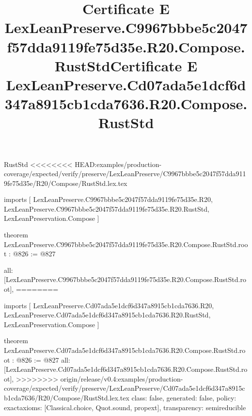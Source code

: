 \begin{lexlean}{RustStd}
<<<<<<<< HEAD:examples/production-coverage/expected/verify/preserve/LexLeanPreserve/C9967bbbe5c2047f57dda9119fe75d35e/R20/Compose/RustStd.lex.tex
\title{Certificate E LexLeanPreserve.C9967bbbe5c2047f57dda9119fe75d35e.R20.Compose.RustStd}
\begin{coremodule}
imports [
  LexLeanPreserve.C9967bbbe5c2047f57dda9119fe75d35e.R20,
  LexLeanPreserve.C9967bbbe5c2047f57dda9119fe75d35e.R20.RustStd,
  LexLeanPreservation.Compose
]

theorem LexLeanPreserve.C9967bbbe5c2047f57dda9119fe75d35e.R20.Compose.RustStd.root : @826 := @827 {
  all: [LexLeanPreserve.C9967bbbe5c2047f57dda9119fe75d35e.R20.Compose.RustStd.root],
========
\title{Certificate E LexLeanPreserve.Cd07ada5e1dcf6d347a8915cb1cda7636.R20.Compose.RustStd}
\begin{coremodule}
imports [
  LexLeanPreserve.Cd07ada5e1dcf6d347a8915cb1cda7636.R20,
  LexLeanPreserve.Cd07ada5e1dcf6d347a8915cb1cda7636.R20.RustStd,
  LexLeanPreservation.Compose
]

theorem LexLeanPreserve.Cd07ada5e1dcf6d347a8915cb1cda7636.R20.Compose.RustStd.root : @826 := @827 {
  all: [LexLeanPreserve.Cd07ada5e1dcf6d347a8915cb1cda7636.R20.Compose.RustStd.root],
>>>>>>>> origin/release/v0.4:examples/production-coverage/expected/verify/preserve/LexLeanPreserve/Cd07ada5e1dcf6d347a8915cb1cda7636/R20/Compose/RustStd.lex.tex
  class: false,
  generated: false,
  policy: exact{axioms: [Classical.choice, Quot.sound, propext]},
  transparency: semireducible
}


\end{coremodule}}
\end{coremodule}
\end{lexlean}
